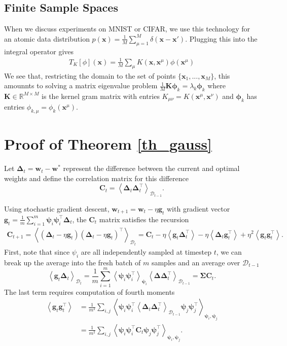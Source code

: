\documentclass{article} %
\def\x{\bm x}
\def\w{\bm w}
\def\x{\mathbf x}
\def\w{\mathbf w}
\def\bSigma{\mathbf \Sigma}
\def\C{\mathbf C}
\def\g{\mathbf g}
\begin{document}
\subsection{Finite Sample Spaces}
When we discuss experiments on MNIST or CIFAR, we use this technology for an atomic data distribution $p(\x) = \frac{1}{M} \sum_{\mu=1}^M \delta(\x-\x')$. Plugging this into the integral operator gives 
\begin{align}
    T_K[\phi](\x) = \frac{1}{M} \sum_{\mu} K(\x,\x^\mu) \phi(\x^\mu)
\end{align}
We see that, restricting the domain to the set of points $\{ \x_1,...,\x_M \}$, this amounnts to solving a matrix eigenvalue problem $\frac{1}{M} \bm K \bm\phi_k = \lambda_k \bm\phi_k$ where $\bm K \in \mathbb{R}^{M \times M}$ is the kernel gram matrix with entries $K_{\mu\nu} = K(\x^\mu,\x^\nu)$ and $\bm\phi_k$ has entries $\phi_{k,\mu} = \phi_k(\x^\mu)$.

\section{Proof of Theorem \ref{th_gauss}}\label{gauss_derivation}

Let $\bm\Delta_t = \w_t - \w^*$ represent the difference between the current and optimal weights and define the correlation matrix for this difference
\begin{equation}
    \C_t = \left< \bm\Delta_t \bm\Delta_t^\top \right>_{\mathcal D_{t-1}}.
\end{equation}

Using stochastic gradient descent, $\w_{t+1} = \w_t - \eta \g_t$ with gradient vector $\g_t = \frac{1}{m} \sum_{i=1}^m \bm\psi_i \bm\psi_i^\top \bm\Delta_t$, the $\C_t$ matrix satisfies the recursion
\begin{align}
    \C_{t+1} = \left< ( \bm\Delta_t - \eta \g_t ) (\bm \Delta_t - \eta \g_t )^\top  \right>_{\mathcal D_t} = \C_t - \eta \left<\g_t \bm\Delta_t^\top \right> - \eta \left< \bm\Delta_t \g_t^\top  \right> + \eta^2 \left< \g_t \g_t^\top \right>.
\end{align}
%
First, note that since $\psi_i$ are all independently sampled at timestep $t$, we can break up the average into the fresh batch of $m$ samples and an average over $\mathcal{D}_{t-1}$
%
\begin{equation}
    \left< \g_t \bm\Delta_t \right>_{\mathcal D_t} = \frac{1}{m} \sum_{i=1}^m \left< \bm\psi_i \bm\psi_i^\top \right>_{\bm\psi_i} \left< \bm\Delta \bm\Delta_t^\top \right>_{\mathcal D_{t-1}} = \bSigma \C_t.
\end{equation}
%
The last term requires computation of fourth moments
\begin{align}
    \left< \g_t \g_t^\top \right> &= \frac{1}{m^2} \sum_{i,j} \left< \bm\psi_i \bm\psi_i^\top \left< \bm\Delta_t \bm\Delta_t^\top \right>_{\mathcal D_{t-1}} \bm\psi_j \bm\psi_j^\top  \right>_{\bm\psi_i,\bm\psi_j} 
    \\
    &= \frac{1}{m^2} \sum_{i,j} \left< \bm\psi_i \bm\psi_i^\top \C_t \bm\psi_j \bm\psi_j^\top  \right>_{\bm\psi_i,\bm\psi_j} .
\end{align}
\end{document}
